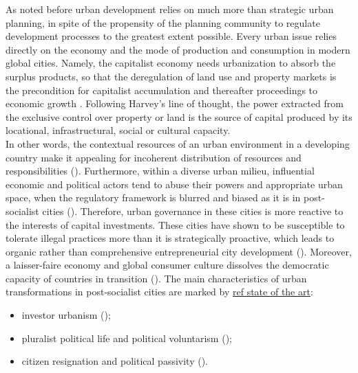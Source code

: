 \documentclass[11pt]{report}
\begin{document}
As noted before urban development relies on much more than strategic urban planning, in spite of the propensity of the planning community to regulate development processes to the greatest extent possible. Every urban issue relies directly on the economy and the mode of production and consumption in modern global cities.
Namely, the capitalist economy needs urbanization to absorb the surplus products, so that the deregulation of land use and property markets is the precondition for capitalist accumulation and thereafter proceedings to economic growth \cite{(Harvey 2012)}. Following Harvey’s line of thought, the power extracted from the exclusive control over property or land is the source of capital produced by its locational, infrastructural, social or cultural capacity.
\\
In other words, the contextual resources of an urban environment in a developing country make it appealing for incoherent distribution of resources and responsibilities (\cite{(Bolay et al. 2005)}). Furthermore, within a diverse urban milieu, influential economic and political actors tend to abuse their powers and appropriate urban space, when the regulatory framework is blurred and biased as it is in post-socialist cities (\cite{(Djokic et al. 2007)}). 
Therefore, urban governance in these cities is more reactive to the interests of capital investments.
These cities have shown to be susceptible to tolerate illegal practices more than it is strategically proactive, which leads to organic rather than comprehensive entrepreneurial city development (\href{ref}{\citealt{petrovic_cities_2009}}).
Moreover, a laisser-faire economy and global consumer culture  dissolves the democratic capacity of countries in transition (\cite{(Ellin 1999)}). The main characteristics of urban transformations in post-socialist cities are marked by \href{ref}{ref state of the art}:

\begin{itemize}
\item investor urbanism (\cite{(Vujosevic 2010)});
\item pluralist political life and political voluntarism (\cite{(Djokic et al. 2007)});
\item citizen resignation and political passivity (\href{ref}{\citealt{vujovic_belgrades_2007}}).
\end{itemize}
\end{document}

